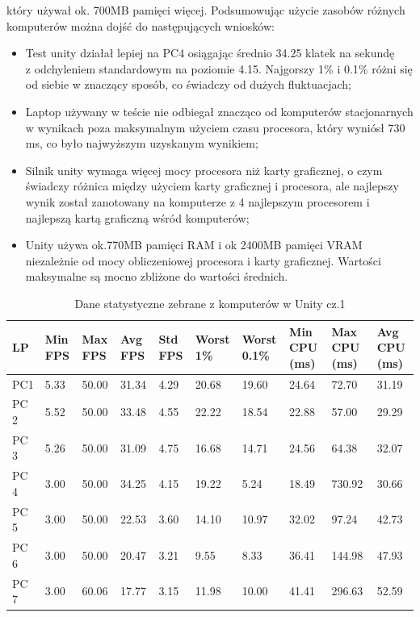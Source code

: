 \documentclass[12pt,twoside]{article}
\begin{document}
który używał ok. 700MB pamięci więcej. 
Podsumowując użycie zasobów różnych komputerów można dojść do następujących
wniosków:
\begin{itemize}
\item Test unity działał lepiej na PC4 osiągając średnio 34.25 klatek na
sekundę\\z odchyleniem standardowym  na poziomie 4.15. Najgorszy 1\% i 0.1\%
różni się od siebie w znaczący sposób, co świadczy od dużych fluktuacjach; 

\item Laptop używany w teście nie odbiegał znacząco od komputerów stacjonarnych
w wynikach poza maksymalnym użyciem czasu procesora, który wyniósł 730 ms, co
było najwyższym uzyskanym wynikiem; 

\item Silnik unity wymaga więcej mocy procesora niż karty graficznej, o czym
świadczy różnica między użyciem karty graficznej i procesora, ale najlepszy
wynik został zanotowany na komputerze z 4 najlepszym procesorem i najlepszą
kartą graficzną wśród komputerów; 

\item Unity używa ok.770MB pamięci RAM i ok 2400MB pamięci VRAM niezależnie od
mocy obliczeniowej procesora i karty graficznej. Wartości maksymalne są mocno
zbliżone do wartości średnich. 
\end{itemize}

\begin{table}[h]
    \caption{Dane statystyczne zebrane z komputerów w Unity cz.1}
    \centering		
        \begin{tabular}{|p{1cm}|p{1cm}|p{1cm}|p{1cm}|p{1cm}|p{1cm}|p{1cm}|p{1cm}|p{}|p{1cm}|}	
            \hline
            LP & Min FPS & Max FPS & Avg FPS & Std FPS & Worst 1\% & Worst 0.1\% & Min CPU (ms) & Max CPU (ms)  & Avg CPU (ms) \\
            \hline
            PC1 & 5.33 & 50.00 & 31.34 & 4.29 & 20.68 & 19.60 & 24.64 & 72.70 & 31.19 \\
            \hline
            PC 2 & 5.52 & 50.00 & 33.48 & 4.55 & 22.22 & 18.54 & 22.88 & 57.00 & 29.29 \\
            \hline
            PC 3 & 5.26 & 50.00 & 31.09 & 4.75 & 16.68 & 14.71 & 24.56 & 64.38 & 32.07 \\
            \hline
            PC 4 & 3.00 & 50.00 & 34.25 & 4.15 & 19.22 & 5.24 & 18.49 & 730.92 & 30.66 \\
            \hline
            PC 5 & 3.00 & 50.00 & 22.53 & 3.60 & 14.10 & 10.97 & 32.02 & 97.24 & 42.73 \\
            \hline
            PC 6 & 3.00 & 50.00 & 20.47 & 3.21 & 9.55 & 8.33 & 36.41 & 144.98 & 47.93 \\
            \hline
            PC 7 & 3.00 & 60.06 & 17.77 & 3.15 & 11.98 & 10.00 & 41.41 & 296.63 & 52.59 \\
            \hline
        \end{tabular}	
    \label{Tabela:StatystykiUnity1}
\end{table}	
\end{document}
